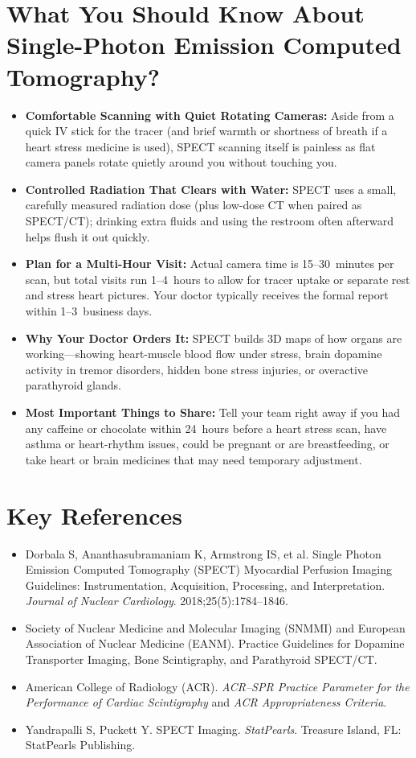 \section{What You Should Know About Single-Photon Emission Computed Tomography?}

\begin{itemize}
    \item \textbf{Comfortable Scanning with Quiet Rotating Cameras:} Aside from a quick IV stick for the tracer (and brief warmth or shortness of breath if a heart stress medicine is used), SPECT scanning itself is painless as flat camera panels rotate quietly around you without touching you.
    \item \textbf{Controlled Radiation That Clears with Water:} SPECT uses a small, carefully measured radiation dose (plus low-dose CT when paired as SPECT/CT); drinking extra fluids and using the restroom often afterward helps flush it out quickly.
    \item \textbf{Plan for a Multi-Hour Visit:} Actual camera time is 15--30~minutes per scan, but total visits run 1--4~hours to allow for tracer uptake or separate rest and stress heart pictures. Your doctor typically receives the formal report within 1--3~business days.
    \item \textbf{Why Your Doctor Orders It:} SPECT builds 3D maps of how organs are working---showing heart-muscle blood flow under stress, brain dopamine activity in tremor disorders, hidden bone stress injuries, or overactive parathyroid glands.
    \item \textbf{Most Important Things to Share:} Tell your team right away if you had any caffeine or chocolate within 24~hours before a heart stress scan, have asthma or heart-rhythm issues, could be pregnant or are breastfeeding, or take heart or brain medicines that may need temporary adjustment.
\end{itemize}

\section{Key References}

\begin{itemize}
    \item Dorbala S, Ananthasubramaniam K, Armstrong IS, et al. Single Photon Emission Computed Tomography (SPECT) Myocardial Perfusion Imaging Guidelines: Instrumentation, Acquisition, Processing, and Interpretation. \textit{Journal of Nuclear Cardiology}. 2018;25(5):1784--1846.
    \item Society of Nuclear Medicine and Molecular Imaging (SNMMI) and European Association of Nuclear Medicine (EANM). Practice Guidelines for Dopamine Transporter Imaging, Bone Scintigraphy, and Parathyroid SPECT/CT.
    \item American College of Radiology (ACR). \textit{ACR--SPR Practice Parameter for the Performance of Cardiac Scintigraphy} and \textit{ACR Appropriateness Criteria}.
    \item Yandrapalli S, Puckett Y. SPECT Imaging. \textit{StatPearls}. Treasure Island, FL: StatPearls Publishing.
\end{itemize}
